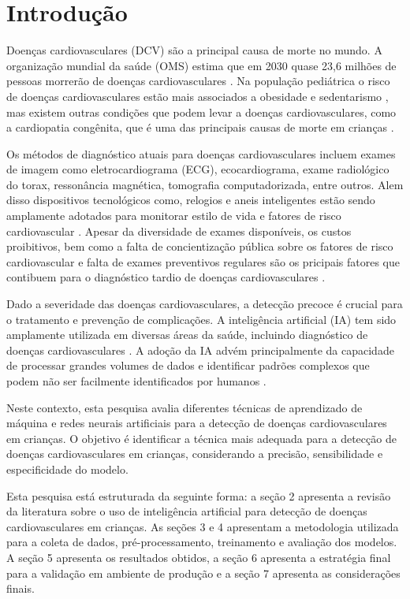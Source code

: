 \section{Introdução}

Doenças cardiovasculares (DCV) são a principal causa de morte no mundo. A organização mundial da saúde (OMS) estima que em 2030 quase 23,6 milhões de pessoas morrerão de doenças cardiovasculares \cite{world2011global}. Na população pediátrica o risco de doenças cardiovasculares estão mais associados a obesidade e sedentarismo \cite{dias_risco_2023}, mas existem outras condições que podem levar a doenças cardiovasculares, como a cardiopatia congênita, que é uma das principais causas de morte em crianças \cite{born20098}.

Os métodos de diagnóstico atuais para doenças cardiovasculares incluem exames de imagem como eletrocardiograma (ECG), ecocardiograma, exame radiológico do torax, ressonância magnética, tomografia computadorizada, entre outros. Alem disso dispositivos tecnológicos como, relogios e aneis inteligentes estão sendo amplamente adotados para monitorar estilo de vida e fatores de risco cardiovascular \cite{akinosun2021digital}. Apesar da diversidade de exames disponíveis, os custos proibitivos, bem como a falta de concientização pública sobre os fatores de risco cardiovascular e falta de exames preventivos regulares são os pricipais fatores que contibuem para o diagnóstico tardio de doenças cardiovasculares \cite{magalhaes2024desafios}.

Dado a severidade das doenças cardiovasculares, a detecção precoce é crucial para o tratamento e prevenção de complicações. A inteligência artificial (IA) tem sido amplamente utilizada em diversas áreas da saúde, incluindo diagnóstico de doenças cardiovasculares \cite{subramani_cardiovascular_2023,dahia_implementing_2023, abdulsalam2023explainable,linardos2022federated}. A adoção da IA advém principalmente da capacidade de processar grandes volumes de dados e identificar padrões complexos que podem não ser facilmente identificados por humanos \cite{van2022critical}.

Neste contexto, esta pesquisa avalia diferentes técnicas de aprendizado de máquina e redes neurais artificiais para a detecção de doenças cardiovasculares em crianças. O objetivo é identificar a técnica mais adequada para a detecção de doenças cardiovasculares em crianças, considerando a precisão, sensibilidade e especificidade do modelo.

Esta pesquisa está estruturada da seguinte forma: a seção 2 apresenta a revisão da literatura sobre o uso de inteligência artificial para detecção de doenças cardiovasculares em crianças. As seções 3 e 4 apresentam a metodologia utilizada para a coleta de dados, pré-processamento, treinamento e avaliação dos modelos. A seção 5 apresenta os resultados obtidos, a seção 6 apresenta a estratégia final para a validação em ambiente de produção e a seção 7 apresenta as considerações finais.